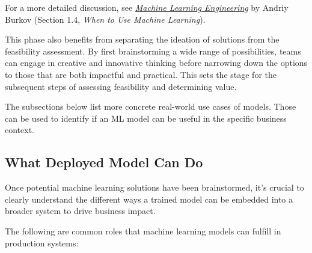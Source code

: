 \documentclass[12pt,openany]{book}
\begin{document}
For a more detailed discussion, see \href{https://www.amazon.it/Machine-Learning-Engineering-Andriy-Burkov/dp/1999579577}{\textit{Machine Learning Engineering}} by Andriy Burkov (Section 1.4, \textit{When to Use Machine Learning}). \newline

This phase also benefits from separating the ideation of solutions from the feasibility assessment. By first brainstorming a wide range of possibilities, teams can engage in creative and innovative thinking before narrowing down the options to those that are both impactful and practical. This sets the stage for the subsequent steps of assessing feasibility and determining value. \newline

The subsections below list more concrete real-world use cases of models. Those can be used to identify if an ML model can be useful in the specific business context.


\subsection{What Deployed Model Can Do}

Once potential machine learning solutions have been brainstormed, it's crucial to clearly understand the different ways a trained model can be embedded into a broader system to drive business impact. \newline

The following are common roles that machine learning models can fulfill in production systems:
\end{document}
